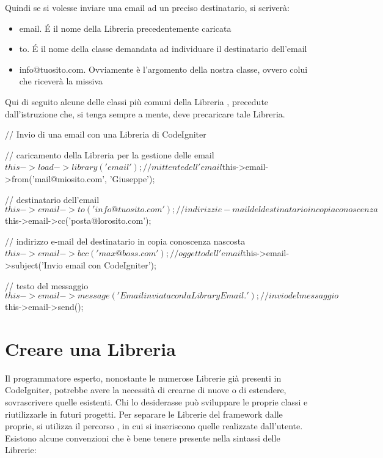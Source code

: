 Quindi se si volesse inviare una email ad un preciso destinatario, si scriverà:


\begin{itemize}
\item email. \'E il nome della Libreria precedentemente caricata
\item to. \'E il nome della classe demandata ad individuare il destinatario dell'email
\item info@tuosito.com. Ovviamente è l'argomento della nostra classe, ovvero colui che riceverà la missiva
\end{itemize}

Qui di seguito alcune delle classi più comuni della Libreria , precedute dall'istruzione che, si tenga sempre a mente, deve precaricare tale Libreria.

\begin{code}
// Invio di una email con una Libreria di CodeIgniter

// caricamento della Libreria per la gestione delle email
$this->load->library('email');

// mittente dell'email
$this->email->from('mail@miosito.com', 'Giuseppe');

// destinatario dell'email
$this->email->to('info@tuosito.com');

// indirizzi e-mail del destinatario in copia conoscenza
$this->email->cc('posta@lorosito.com');

// indirizzo e-mail del destinatario in copia conoscenza nascosta
$this->email->bcc('max@boss.com');

// oggetto dell'email
$this->email->subject('Invio email con CodeIgniter');

// testo del messaggio
$this->email->message('Email inviata con la Library Email.');

// invio del messaggio
$this->email->send();
\end{code}

\section*{Creare una Libreria}
Il programmatore esperto, nonostante le numerose Librerie già presenti in CodeIgniter, potrebbe avere la necessità di crearne di nuove o di estendere, sovrascrivere quelle esistenti. Chi lo desiderasse può sviluppare le proprie classi e riutilizzarle in futuri progetti. Per separare le Librerie del framework dalle proprie, si utilizza il percorso , in cui si inseriscono quelle realizzate dall'utente. Esistono alcune convenzioni che è bene tenere presente nella sintassi delle Librerie:

